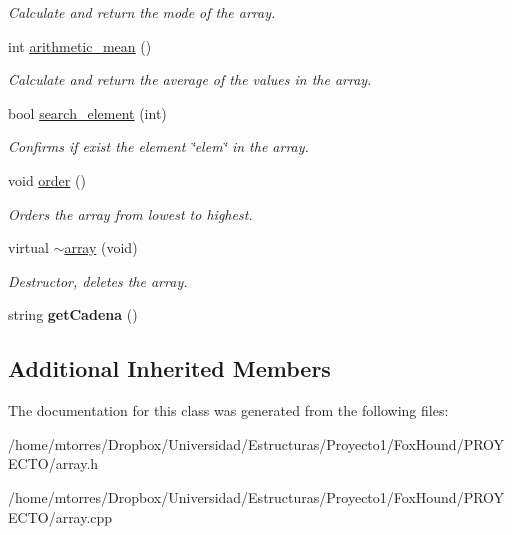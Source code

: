 \begin{DoxyCompactItemize}
\begin{DoxyCompactList}\small\item\em Calculate and return the mode of the array. \end{DoxyCompactList}\item 
\hypertarget{classarray_a2a261ef6223d7a7ec17881b97c36f8b6}{int \hyperlink{classarray_a2a261ef6223d7a7ec17881b97c36f8b6}{arithmetic\-\_\-mean} ()}\label{classarray_a2a261ef6223d7a7ec17881b97c36f8b6}

\begin{DoxyCompactList}\small\item\em Calculate and return the average of the values in the array. \end{DoxyCompactList}\item 
\hypertarget{classarray_a411982e015049087a459f6ae39b6114b}{bool \hyperlink{classarray_a411982e015049087a459f6ae39b6114b}{search\-\_\-element} (int)}\label{classarray_a411982e015049087a459f6ae39b6114b}

\begin{DoxyCompactList}\small\item\em Confirms if exist the element \char`\"{}elem\char`\"{} in the array. \end{DoxyCompactList}\item 
\hypertarget{classarray_a38e384e7d7ad83f194639013cf7eb7fd}{void \hyperlink{classarray_a38e384e7d7ad83f194639013cf7eb7fd}{order} ()}\label{classarray_a38e384e7d7ad83f194639013cf7eb7fd}

\begin{DoxyCompactList}\small\item\em Orders the array from lowest to highest. \end{DoxyCompactList}\item 
\hypertarget{classarray_a9650b46e4d802e77a89ec65e248c523e}{virtual \hyperlink{classarray_a9650b46e4d802e77a89ec65e248c523e}{$\sim$array} (void)}\label{classarray_a9650b46e4d802e77a89ec65e248c523e}

\begin{DoxyCompactList}\small\item\em Destructor, deletes the array. \end{DoxyCompactList}\item 
\hypertarget{classarray_ac4088f8ff54a0a4e016ac66b900c976a}{string {\bfseries get\-Cadena} ()}\label{classarray_ac4088f8ff54a0a4e016ac66b900c976a}

\end{DoxyCompactItemize}
\subsection*{Additional Inherited Members}


The documentation for this class was generated from the following files\-:\begin{DoxyCompactItemize}
\item 
/home/mtorres/\-Dropbox/\-Universidad/\-Estructuras/\-Proyecto1/\-Fox\-Hound/\-P\-R\-O\-Y\-E\-C\-T\-O/array.\-h\item 
/home/mtorres/\-Dropbox/\-Universidad/\-Estructuras/\-Proyecto1/\-Fox\-Hound/\-P\-R\-O\-Y\-E\-C\-T\-O/array.\-cpp\end{DoxyCompactItemize}
